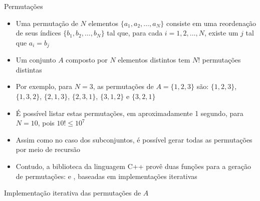 \begin{frame}[fragile]{Permutações}

    \begin{itemize}
        \item Uma permutação de $N$ elementos $\lbrace a_1, a_2, \ldots, a_N\rbrace$ consiste
            em uma reordenação de seus índices $\lbrace b_1, b_2, \ldots, b_N\rbrace$ tal que,
            para cada $i = 1, 2, \ldots, N$, existe um $j$ tal que $a_i = b_j$

        \item Um conjunto $A$ composto por $N$ elementos distintos tem $N!$ permutações distintas

        \item Por exemplo, para $N = 3$, as permutações de $A = \lbrace 1, 2, 3\rbrace$ são:
            $\lbrace 1, 2, 3\rbrace$, $\lbrace 1, 3, 2\rbrace$, $\lbrace 2, 1, 3\rbrace$,
            $\lbrace 2, 3, 1\rbrace$, $\lbrace 3, 1, 2\rbrace$ e $\lbrace 3, 2, 1\rbrace$

        \item É possível listar estas permutações, em aproximadamente 1 segundo, para
            $N = 10$, pois $10! \leq 10^7$

        \item Assim como no caso dos subconjuntos, é possível gerar todas as permutações por
            meio de recursão
        
        \item Contudo, a biblioteca  da linguagem C++ provê duas funções
            para a geração de permutações:  e
            , baseadas em implementações iterativas
    \end{itemize}

\end{frame}

\begin{frame}[fragile]{Implementação iterativa das permutações de $A$}
\end{frame}

